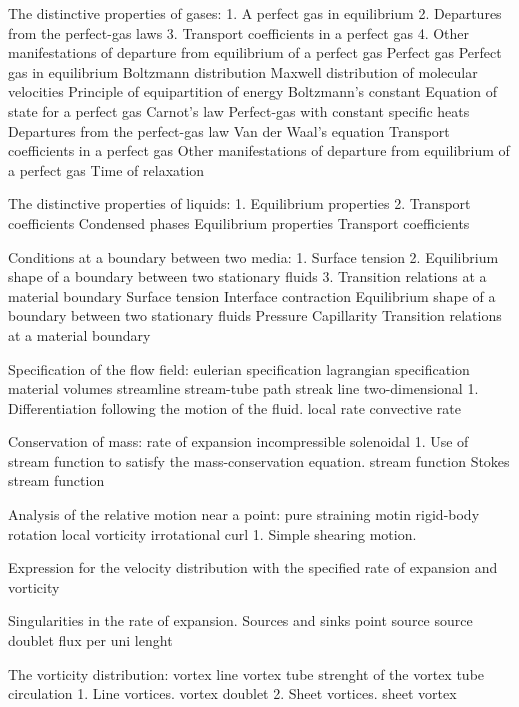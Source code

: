 \begin{multicols}{3}
  The distinctive properties of gases:
  1. A perfect gas in equilibrium
  2. Departures from the perfect-gas laws
  3. Transport coefficients in a perfect gas
  4. Other manifestations of departure from equilibrium of a perfect gas
  Perfect gas
  Perfect gas in equilibrium
  Boltzmann distribution
  Maxwell distribution of molecular velocities
  Principle of equipartition of energy
  Boltzmann's constant
  Equation of state for a perfect gas
  Carnot's law
  Perfect-gas with constant specific heats
  Departures from the perfect-gas law
  Van der Waal's equation
  Transport coefficients in a perfect gas
  Other manifestations of departure from equilibrium of a perfect gas
  Time of relaxation



  The distinctive properties of liquids:
  1. Equilibrium properties
  2. Transport coefficients
  Condensed phases
  Equilibrium properties
  Transport coefficients



  Conditions at a boundary between two media:
  1. Surface tension
  2. Equilibrium shape of a boundary between two stationary fluids
  3. Transition relations at a material boundary
  Surface tension
  Interface contraction
  Equilibrium shape of a boundary between two stationary fluids
  Pressure
  Capillarity
  Transition relations at a material boundary

  Specification of the flow field:
  eulerian specification
  lagrangian specification
  material volumes
  streamline
  stream-tube
  path
  streak line
  two-dimensional
  1. Differentiation following the motion of the fluid.
  local rate
  convective rate

  Conservation of mass:
  rate of expansion
  incompressible
  solenoidal
  1. Use of stream function to satisfy the mass-conservation equation.
  stream function
  Stokes stream function

  Analysis of the relative motion near a point:
  pure straining motin
  rigid-body rotation
  local vorticity
  irrotational curl
  1. Simple shearing motion.

  Expression for the velocity distribution with the specified rate of expansion and vorticity

  Singularities in the rate of expansion. Sources and sinks
  point source
  source doublet
  flux per uni lenght

  The vorticity distribution:
  vortex line
  vortex tube
  strenght of the vortex tube
  circulation
  1. Line vortices.
  vortex doublet
  2. Sheet vortices.
  sheet vortex


\end{multicols}
